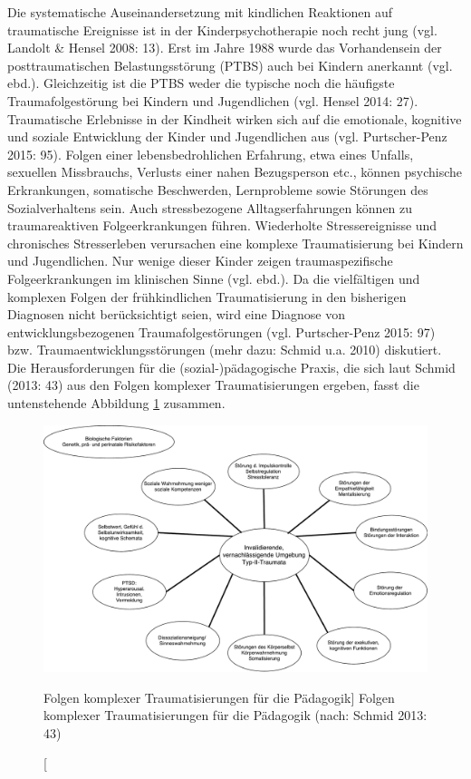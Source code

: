 Die systematische Auseinandersetzung mit kindlichen Reaktionen auf traumatische Ereignisse ist in der Kinderpsychotherapie noch recht jung (vgl. Landolt \& Hensel 2008: 13). Erst im Jahre 1988 wurde das Vorhandensein der posttraumatischen Belastungsstörung (PTBS) auch bei Kindern anerkannt (vgl. ebd.). Gleichzeitig ist die PTBS weder die typische noch die häufigste Traumafolgestörung bei Kindern und Jugendlichen (vgl. Hensel 2014: 27). Traumatische Erlebnisse in der Kindheit wirken sich auf die emotionale, kognitive und soziale Entwicklung der Kinder und Jugendlichen aus (vgl. Purtscher-Penz 2015: 95). Folgen einer lebensbedrohlichen Erfahrung, etwa eines Unfalls, sexuellen Missbrauchs, Verlusts einer nahen Bezugsperson etc., können psychische Erkrankungen, somatische Beschwerden, Lernprobleme sowie Störungen des Sozialverhaltens sein. Auch stressbezogene Alltagserfahrungen können zu traumareaktiven Folgeerkrankungen führen. Wiederholte Stressereignisse und chronisches Stresserleben verursachen eine komplexe Traumatisierung bei Kindern und Jugendlichen. Nur wenige dieser Kinder zeigen traumaspezifische Folgeerkrankungen im klinischen Sinne (vgl. ebd.). Da die vielfältigen und komplexen Folgen der frühkindlichen Traumatisierung in den bisherigen Diagnosen nicht berücksichtigt seien, wird eine Diagnose von entwicklungsbezogenen Traumafolgestörungen (vgl. Purtscher-Penz 2015: 97) bzw. Traumaentwicklungsstörungen (mehr dazu: Schmid u.a. 2010) diskutiert. Die Herausforderungen für die (sozial-)pädagogische Praxis, die sich laut Schmid (2013: 43) aus den Folgen komplexer Traumatisierungen ergeben, fasst die untenstehende Abbildung \ref{fig:folgen} zusammen.

\begin{figure}[h]
  \centering
  \includegraphics[scale=0.45]{abbildung4}
  \caption
      [Folgen komplexer Traumatisierungen für die Pädagogik]
      {Folgen komplexer Traumatisierungen für die Pädagogik (nach: Schmid 2013: 43)}
  \label{fig:folgen}
\end{figure}

